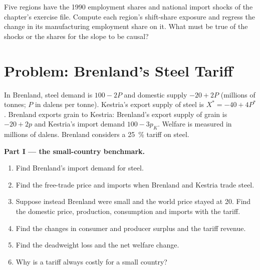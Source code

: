 \begin{exercise}[$\star\star\star$]\label{exo:b3:trade-policy:12}
Five regions have the 1990 employment shares and national import shocks of the
chapter's exercise file. Compute each region's shift-share exposure and regress the
change in its manufacturing employment share on it. What must be true of the
shocks or the shares for the slope to be causal?
\end{exercise}

\section{Problem: Brenland's Steel Tariff}\label{sec:b3:trade-policy:problem}

\begin{problem}\label{pb:b3:trade-policy:steel}
In Brenland, steel demand is $100 - 2P$ and domestic supply $-20 + 2P$ (millions of
tonnes; $P$ in dalens per tonne). Kestria's export supply of steel is $X^* = -40 + 4P^*$.
Brenland exports grain to Kestria: Brenland's export supply of grain is $-20 + 2p$
and Kestria's import demand $100 - 3p_K$. Welfare is measured in millions of
dalens. Brenland considers a 25~\% tariff on steel.

\medskip\noindent\textbf{Part I --- the small-country benchmark.}
\begin{enumerate}
\item Find Brenland's import demand for steel.
\item Find the free-trade price and imports when Brenland and Kestria trade steel.
\item Suppose instead Brenland were small and the world price stayed at 20. Find
the domestic price, production, consumption and imports with the tariff.
\item Find the changes in consumer and producer surplus and the tariff revenue.
\item Find the deadweight loss and the net welfare change.
\item Why is a tariff always costly for a small country?
\end{enumerate}


\end{problem}
